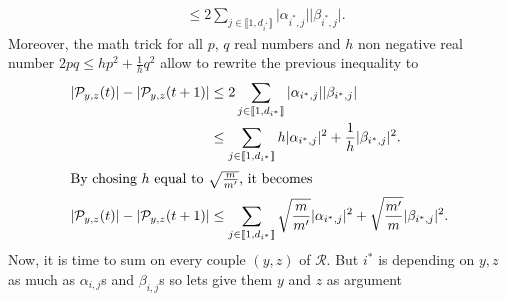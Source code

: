 \begin{appendix}
\begin{tproof}
\begin{align*}
                                                                                & \leq 2\sum_{j\in\llbracket1,d_{i^*}\rrbracket} \vert\alpha_{i^*,j}\vert\vert\beta_{i^*,j}\vert.
        \end{align*}
        Moreover, the math trick for all $p$, $q$ real numbers and $h$ non negative real number
        $2pq \leq hp^2 + \frac{1}{h}q^2 $ allow to rewrite the previous inequality to
        \begin{align*}
            \vert \mathcal{P}_{y,z}(t)\vert - \vert \mathcal{P}_{y,z}(t+1)\vert & \leq 2\sum_{j\in\llbracket1,d_{i^*}\rrbracket}  \vert\alpha_{i^*,j}\vert\vert\beta_{i^*,j}\vert                                             \\
                                                                                & \leq \sum_{j\in\llbracket1,d_{i^*}\rrbracket} h\vert\alpha_{i^*,j}\vert^2 + \frac{1}{h}\vert\beta_{i^*,j}\vert^2.                           \\
            \intertext{By chosing $h$ equal to $\sqrt{\frac{m}{m'}}$, it becomes}
            \vert \mathcal{P}_{y,z}(t)\vert - \vert \mathcal{P}_{y,z}(t+1)\vert & \leq \sum_{j\in\llbracket1,d_{i^*}\rrbracket} \sqrt{\frac{m}{m'}}\vert\alpha_{i^*,j}\vert^2 + \sqrt{\frac{m'}{m}}\vert\beta_{i^*,j}\vert^2. \\
        \end{align*}
        Now, it is time to sum on every couple $(y,z)$ of $\mathcal{R}$. But $i^*$ is depending on $y,z$ as much
        as $\alpha_{i,j}$s and $\beta_{i,j}$s so lets give them $y$ and $z$ as argument


\end{tproof}
\end{appendix}
